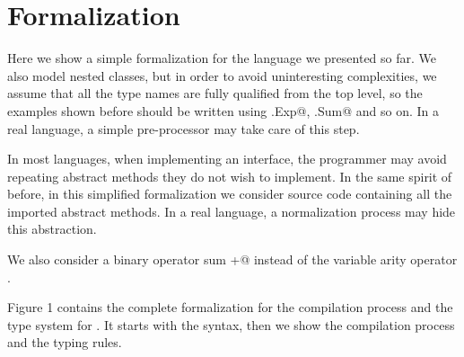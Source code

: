 \saveSpace\saveSpace\section{Formalization}\label{sec:formal}
\saveSpace\saveSpace

Here we show a simple formalization for the language we presented so far.
We also model nested classes, but in order to avoid uninteresting complexities, we assume that
all the type names are fully qualified from the top level, so the examples shown before should be
written using \Q@This.Exp@, \Q@This.Sum@ and so on.
In a real language, a simple pre-processor may take care of this step.

In most languages, when implementing an interface, the programmer may avoid repeating abstract methods
they do not wish to implement.
In the same spirit of before, in this simplified formalization we consider source code containing
all the imported abstract methods. In a real language, a normalization process
may hide this abstraction.

We also consider a binary operator sum \Q@+@ instead of the variable arity operator \Q@use@.

Figure 1 contains the complete formalization for the 
compilation process and the type system for \name.
It starts with the syntax, then
we show the compilation process and the typing rules.





